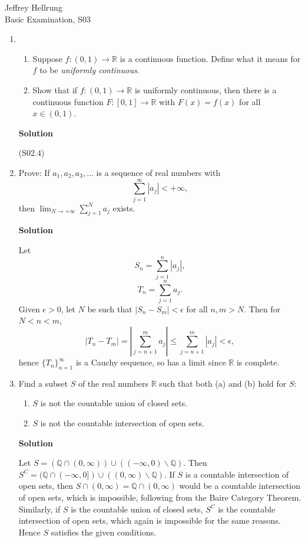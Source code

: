 \documentclass{article}
\begin{document}
\begin{flushright}
Jeffrey Hellrung \\
Basic Examination, S03 \\
\end{flushright}


\begin{enumerate}

\item

\begin{enumerate}
\item Suppose \(f : (0,1) \to \mathbb{R}\) is a continuous function.  Define what it means for \(f\) to be {\em uniformly continuous}.

\item Show that if \(f : (0,1) \to \mathbb{R}\) is uniformly continuous, then there is a continuous function \(F : [0,1] \to \mathbb{R}\) with \(F(x) = f(x)\) for all \(x \in (0,1)\).

\end{enumerate}

{\bf Solution}

(S02.4)



\item Prove:  If \(a_1, a_2, a_3, \ldots\) is a sequence of real numbers with
\[\sum_{j = 1}^{\infty} |a_j| < +\infty,\]
then \(\lim_{N \to +\infty} \sum_{j = 1}^N a_j\) exists.

{\bf Solution}

Let
\[S_n = \sum_{j = 1}^n |a_j|,\]
\[T_n = \sum_{j = 1}^n a_j.\]
Given \(\epsilon > 0\), let \(N\) be such that \(|S_n - S_m| < \epsilon\) for all \(n,m > N\).  Then for \(N < n < m\),
\[|T_n - T_m| = \left| \sum_{j = n + 1}^m a_j \right| \leq \sum_{j = n + 1}^m |a_j| < \epsilon,\]
hence \(\{T_n\}_{n = 1}^{\infty}\) is a Cauchy sequence, so has a limit since \(\mathbb{R}\) is complete.



\item Find a subset \(S\) of the real numbers \(\mathbb{R}\) such that both (a) and (b) hold for \(S\):
\begin{enumerate}
\item \(S\) is not the countable union of closed sets.
\item \(S\) is not the countable intersection of open sets.
\end{enumerate}

{\bf Solution}

Let \(S = (\mathbb{Q} \cap (0,\infty)) \cup ((-\infty,0) \backslash \mathbb{Q})\).  Then \(S^{C} = (\mathbb{Q} \cap (-\infty,0]) \cup ((0,\infty) \backslash \mathbb{Q})\).  If \(S\) is a countable intersection of open sets, then \(S \cap (0,\infty) = \mathbb{Q} \cap (0,\infty)\) would be a countable intersection of open sets, which is impossible, following from the Baire Category Theorem.  Similarly, if \(S\) is the countable union of closed sets, \(S^{C}\) is the countable intersection of open sets, which again is impossible for the same reasons.  Hence \(S\) satisfies the given conditions.




\end{enumerate}
\end{document}
